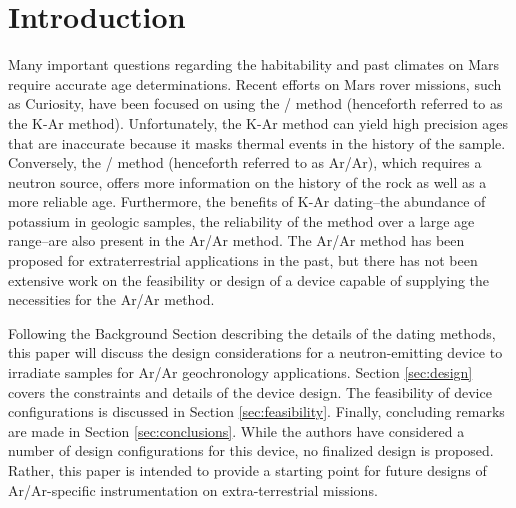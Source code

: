 \documentclass{mc2015}
\begin{document}
\section{Introduction}

Many important questions regarding the habitability and past climates on Mars require accurate age determinations. Recent efforts on Mars rover missions, such as Curiosity, have been focused on using the / method \cite{farley_situ_2014,farley_double-spike_2013,cassata_situ_2014} (henceforth referred to as the K-Ar method). Unfortunately, the K-Ar method can yield high precision ages that are inaccurate because it masks thermal events in the history of the sample. Conversely, the / method \cite{mcdougall_geochronology_1999} (henceforth referred to as Ar/Ar), which requires a neutron source, offers more information on the history of the rock as well as a more reliable age. Furthermore, the benefits of K-Ar dating--the abundance of potassium in geologic samples, the reliability of the method over a large age range--are also present in the Ar/Ar method. The Ar/Ar method has been proposed for extraterrestrial applications \cite{li_evaluation_2011} in the past, but there has not been extensive work on the feasibility or design of a device capable of supplying the necessities for the Ar/Ar method.

Following the Background Section describing the details of the dating methods, this paper will discuss the design considerations for a neutron-emitting device to irradiate samples for Ar/Ar geochronology applications. Section \ref{sec:design} covers the constraints and details of the device design. The feasibility of device configurations is discussed in Section \ref{sec:feasibility}. Finally, concluding remarks are made in Section \ref{sec:conclusions}. While the authors have considered a number of design configurations for this device, no finalized design is proposed. Rather, this paper is intended to provide a starting point for future designs of Ar/Ar-specific instrumentation on extra-terrestrial missions. 
\end{document}
